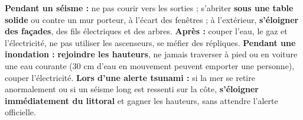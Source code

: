 \documentclass[11pt]{article}
\begin{document}
\begin{aretenir}
\textbf{Pendant un séisme :} ne pas courir vers les sorties ; s'abriter \textbf{sous une table solide} ou contre un mur porteur, à l'écart des fenêtres ; à l'extérieur, \textbf{s'éloigner des façades}, des fils électriques et des arbres. \textbf{Après :} couper l'eau, le gaz et l'électricité, ne pas utiliser les ascenseurs, se méfier des répliques.
\textbf{Pendant une inondation :} \textbf{rejoindre les hauteurs}, ne jamais traverser à pied ou en voiture une eau courante (30 cm d'eau en mouvement peuvent emporter une personne), couper l'électricité.
\textbf{Lors d'une alerte tsunami :} si la mer se retire anormalement ou si un séisme long est ressenti sur la côte, \textbf{s'éloigner immédiatement du littoral} et gagner les hauteurs, sans attendre l'alerte officielle.
\end{aretenir}
\end{document}
